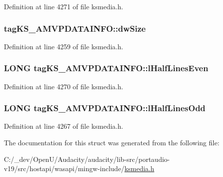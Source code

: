 Definition at line 4271 of file ksmedia.\+h.

\subsubsection[{\texorpdfstring{dw\+Size}{dwSize}}]{ tag\+K\+S\+\_\+\+A\+M\+V\+P\+D\+A\+T\+A\+I\+N\+F\+O\+::dw\+Size}\hypertarget{structtag_k_s___a_m_v_p_d_a_t_a_i_n_f_o_ab03c1719632f1a34ccc44cb01e24d22d}{}\label{structtag_k_s___a_m_v_p_d_a_t_a_i_n_f_o_ab03c1719632f1a34ccc44cb01e24d22d}


Definition at line 4259 of file ksmedia.\+h.

\subsubsection[{\texorpdfstring{l\+Half\+Lines\+Even}{lHalfLinesEven}}]{\setlength{\rightskip}{0pt plus 5cm}L\+O\+NG tag\+K\+S\+\_\+\+A\+M\+V\+P\+D\+A\+T\+A\+I\+N\+F\+O\+::l\+Half\+Lines\+Even}\hypertarget{structtag_k_s___a_m_v_p_d_a_t_a_i_n_f_o_aa20e387f856313443db2bce008af0379}{}\label{structtag_k_s___a_m_v_p_d_a_t_a_i_n_f_o_aa20e387f856313443db2bce008af0379}


Definition at line 4270 of file ksmedia.\+h.

\subsubsection[{\texorpdfstring{l\+Half\+Lines\+Odd}{lHalfLinesOdd}}]{\setlength{\rightskip}{0pt plus 5cm}L\+O\+NG tag\+K\+S\+\_\+\+A\+M\+V\+P\+D\+A\+T\+A\+I\+N\+F\+O\+::l\+Half\+Lines\+Odd}\hypertarget{structtag_k_s___a_m_v_p_d_a_t_a_i_n_f_o_a11992f0b3c4c7d195a47e36237d986de}{}\label{structtag_k_s___a_m_v_p_d_a_t_a_i_n_f_o_a11992f0b3c4c7d195a47e36237d986de}


Definition at line 4267 of file ksmedia.\+h.



The documentation for this struct was generated from the following file\+:\begin{DoxyCompactItemize}
\item 
C\+:/\+\_\+dev/\+Open\+U/\+Audacity/audacity/lib-\/src/portaudio-\/v19/src/hostapi/wasapi/mingw-\/include/\hyperlink{ksmedia_8h}{ksmedia.\+h}\end{DoxyCompactItemize}
